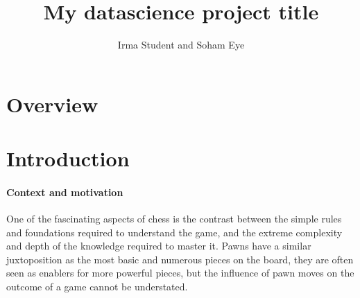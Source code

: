 \documentclass[11pt,a4paper]{article}
\title{My datascience project title}
\author{Irma Student and Soham Eye}
\begin{document}
\maketitle


\section{Overview}

\section{Introduction}

\paragraph{Context and motivation}
One of the fascinating aspects of chess is the contrast between 
the simple rules and foundations required to understand the game, and the 
extreme complexity and depth of the knowledge required to master it.
Pawns have a similar juxtoposition as the most basic and numerous pieces on the 
board, they are often seen as enablers for more powerful pieces, but the influence 
of pawn moves on the outcome of a game cannot be understated. 
\end{document}
